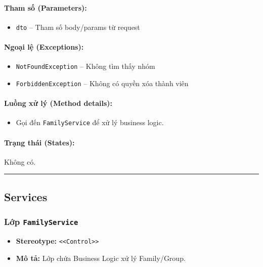 \documentclass[12pt,a4paper]{article}
\begin{document}
\paragraph{Tham số (Parameters):}
\begin{itemize}[leftmargin=*]
    \item \texttt{dto} – Tham số body/params từ request
\end{itemize}


\paragraph{Ngoại lệ (Exceptions):}
\begin{itemize}[leftmargin=*]
    \item \texttt{NotFoundException} – Không tìm thấy nhóm
    \item \texttt{ForbiddenException} – Không có quyền xóa thành viên
\end{itemize}


\paragraph{Luồng xử lý (Method details):}
\begin{itemize}[leftmargin=*]
    \item Gọi đến \texttt{FamilyService} để xử lý business logic.
\end{itemize}


\paragraph{Trạng thái (States):}
Không có.

\vskip 0.5cm
\noindent\rule{\textwidth}{0.5pt}
\vskip 0.5cm

\subsection{Services}


\subsubsection{Lớp \texttt{FamilyService}}

\begin{itemize}[leftmargin=*]
    \item \textbf{Stereotype:} \texttt{\textless{}\textless{}Control\textgreater{}\textgreater{}}
    \item \textbf{Mô tả:} Lớp chứa Business Logic xử lý Family/Group.
\end{itemize}
\end{document}
